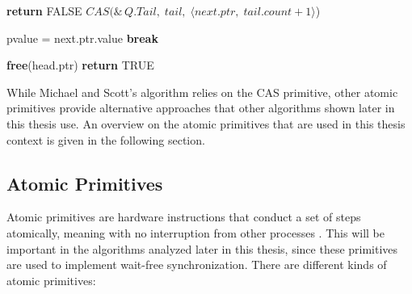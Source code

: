 \begin{algorithm}[!ht]
\begin{algorithmic}[1]
                        \State \textbf{return} FALSE
                    \Else
                        \State 
                        $CAS(\&\,Q.Tail,\; tail,\; \langle next.ptr,\; tail.count+1\rangle$)
                    \EndIf
    
                \Else
                    \State *pvalue = next.ptr.value
                        \State \textbf{break}
                    \EndIf
                \EndIf
            \EndIf
        \EndLoop
    
        \State \textbf{free}(head.ptr)
        \State \textbf{return} TRUE
    
    \EndFunction
    
    \end{algorithmic}
    \cite{MichaelScottQueue}
\end{algorithm} 

While Michael and Scott's algorithm relies on the \ac{CAS} primitive, other atomic primitives provide alternative approaches that other algorithms shown later in this thesis use. An overview on the atomic primitives that are used in this thesis context is given in the following section.

\subsection{Atomic Primitives}\label{subsec:atomic-primitives}
Atomic primitives are hardware instructions that conduct a set of steps atomically, meaning with no interruption from other processes \cite{Atomics}. This will be important in the algorithms analyzed later in this thesis, since these primitives are used to implement wait-free synchronization. There are different kinds of atomic primitives: 

